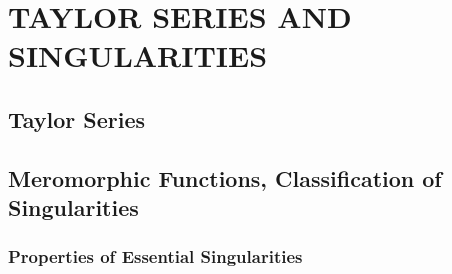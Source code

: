 \section{TAYLOR SERIES AND SINGULARITIES}
\subsection{Taylor Series}
\subsection{Meromorphic Functions, Classification of Singularities}
\subsubsection{Properties of Essential Singularities}

